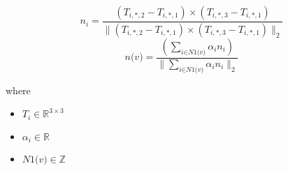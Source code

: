 \documentclass[12pt]{article}
\begin{document}
\[
\textit{n}_{ \textit{i} } = \frac{(\textit{T}_{ \textit{i}, *, 2} - \textit{T}_{ \textit{i}, *, 1}) × (\textit{T}_{ \textit{i}, *, 3} - \textit{T}_{ \textit{i}, *, 1})}{\|(\textit{T}_{ \textit{i}, *, 2} - \textit{T}_{ \textit{i}, *, 1}) × (\textit{T}_{ \textit{i}, *, 3} - \textit{T}_{ \textit{i}, *, 1})\|_2}
\]
\[
\textit{n(v)} = \frac{(\sum_{\textit{i} \in \textit{N1(v)} } \textit{α}_{ \textit{i} }\textit{n}_{ \textit{i} })}{\|\sum_{\textit{i} \in \textit{N1(v)} } \textit{α}_{ \textit{i} }\textit{n}_{ \textit{i} }\|_2}
\]

where
\begin{itemize}
\item $\textit{T}_{\textit{i}} \in \mathbb{R}^{ 3 \times 3 }$
\item $\textit{α}_{\textit{i}} \in \mathbb{{R}}$
\item $\textit{N1(v)} \in \mathbb{Z}$
\end{itemize}
\end{document}
